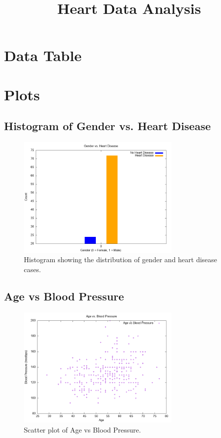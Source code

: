 \documentclass{article}
\begin{document}
\title{Heart Data Analysis}
\author{}
\date{}
\maketitle

\section{Data Table}

\section{Plots}

\subsection{Histogram of Gender vs. Heart Disease}
\begin{figure}[h!]
    \centering
    \includegraphics[width=0.7\textwidth]{gender_vs_heart_disease.png}
    \caption{Histogram showing the distribution of gender and heart disease cases.}
    \label{fig:gender_heart_disease}
\end{figure}

\subsection{Age vs Blood Pressure}
\begin{figure}[h!]
    \centering
    \includegraphics[width=0.7\textwidth]{age_vs_blood_pressure.png}
    \caption{Scatter plot of Age vs Blood Pressure.}
    \label{fig:age_blood_pressure}
\end{figure}
\end{document}
